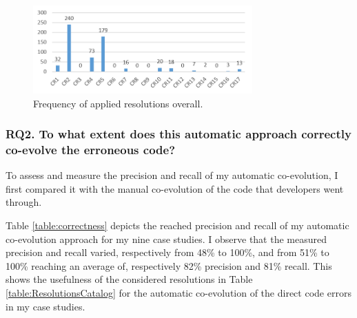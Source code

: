 \begin{figure}
	\centering
\includegraphics[width=0.75\textwidth]{./pics/chapter1pics/FrequencyICSE.png}
\caption{Frequency of applied resolutions overall.}
\label{fig:frequency_resolutions}
\end{figure}


\subsubsection{RQ2. To what extent does this automatic approach correctly co-evolve the erroneous code?}

To assess and measure the precision and recall of my automatic co-evolution, I first compared it with the manual co-evolution of the code that developers went through. 

Table \ref{table:correctness} depicts the reached precision and recall of my automatic co-evolution approach for my nine case studies. I observe that the measured precision and recall varied, respectively from 48\% to 100\%, and from 51\% to 100\% reaching an average of, respectively 82\% precision and 81\% recall. 
%
%
This shows the usefulness of the considered resolutions in Table \ref{table:ResolutionsCatalog} for the automatic co-evolution of the direct code errors in my case studies. %

